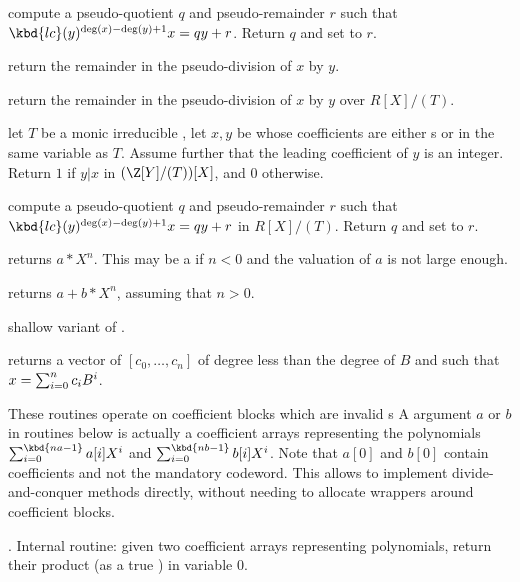 
 compute a pseudo-quotient
$q$ and pseudo-remainder $r$ such that $\kbd{lc}(y)^{\deg(x) - \deg(y) + 1}x
= qy + r$. Return $q$ and set  to $r$.

 return the remainder
in the pseudo-division of $x$ by $y$.

 return the remainder
in the pseudo-division of $x$ by $y$ over $R[X]/(T)$.

 let $T$ be a monic irreducible
, let $x, y$ be  whose coefficients are either s or
 in the same variable as $T$. Assume further that the leading
coefficient of $y$ is an integer. Return $1$ if $y | x$ in $(\Z[Y]/(T))[X]$,
and $0$ otherwise.

 compute
a pseudo-quotient $q$ and pseudo-remainder $r$ such that
$\kbd{lc}(y)^{\deg(x) - \deg(y) + 1}x = qy + r$ in $R[X]/(T)$. Return $q$ and
set  to $r$.

 returns $a * X^n$. This may
be a  if $n < 0$ and the valuation of $a$ is not large
enough.

 returns $a + b * X^n$, assuming
that $n > 0$.

 shallow
variant of .

 returns a vector of 
$[c_0,\ldots,c_n]$ of degree less than the degree of $B$ and such that
$x=\sum_{i=0}^{n}{c_i\*B^i}$.


These routines operate on coefficient blocks which are invalid s
A  argument $a$ or $b$ in routines below is actually a coefficient
arrays representing the polynomials
 $\sum_{i = 0}^{\kbd{na-1}} a[i] X^i$ and
 $\sum_{i = 0}^{\kbd{nb-1}} b[i] X^i$. Note that $a[0]$ and $b[0]$ contain
coefficients and not the mandatory  codeword. This allows to implement
divide-and-conquer methods directly, without needing to allocate wrappers
around coefficient blocks.

. Internal routine:
given two coefficient arrays representing polynomials, return their product (as
a true ) in variable $0$.

